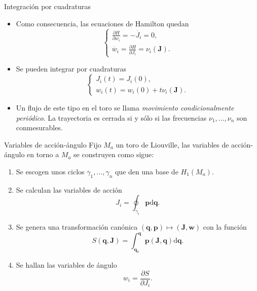 \documentclass[aspectratio=169,mathserif]{beamer}
\newcommand{\vect}[1]{\mathbf{#1}}
\begin{document}
\begin{frame}{Integración por cuadraturas}
  \begin{itemize}
    \item Como consecuencia, las ecuaciones de Hamilton quedan
      \begin{equation*}
	\begin{cases}
	  \frac{\partial H}{\partial w_i}=-\dot{J_i}=0, \\
	  \dot{w_i}= \frac{\partial H}{\partial J_i}=\nu_i(\vect{J}).
	\end{cases}
      \end{equation*}
    \item Se pueden integrar por cuadraturas
      \begin{equation*}
	\begin{cases}
	  J_i(t)=J_i(0), \\
	  w_i(t)=w_i(0)+t\nu_i(\vect{J}).
	\end{cases}
      \end{equation*}
    \item Un flujo de este tipo en el toro se llama \emph{movimiento condicionalmente periódico}. La trayectoria es cerrada si y sólo si las frecuencias $\nu_1,\dots,\nu_n$ son conmesurables.
  \end{itemize}
\end{frame}

  \begin{frame}{Variables de acción-ángulo}
    Fijo $M_a$ un toro de Liouville, las variables de acción-ángulo en torno a $M_a$ se construyen como sigue:
    \begin{enumerate}
      \item Se escogen unos ciclos $\gamma_1,\dots,\gamma_n$ que den una base de $H_1(M_a)$.
      \item Se calculan las variables de acción
	\begin{equation*}
	  J_i=\oint_{\gamma_i}\vect{p}\mathrm{d}\vect{q}.
	\end{equation*}
      \item Se genera una transformación canónica $(\vect{q},\vect{p})\mapsto (\vect{J},\vect{w})$ con la función
	\begin{equation*}
	  S(\vect{q},\vect{J})=\int_{\vect{q}_0}^{\vect{q}}\vect{p}(\vect{J},\vect{q})\mathrm{d}\vect{q}.
	\end{equation*}
      \item Se hallan las variables de ángulo
	\begin{equation*}
	  w_i = \frac{\partial S}{\partial J_i}.
	\end{equation*}
    \end{enumerate}
  \end{frame}
\end{document}

